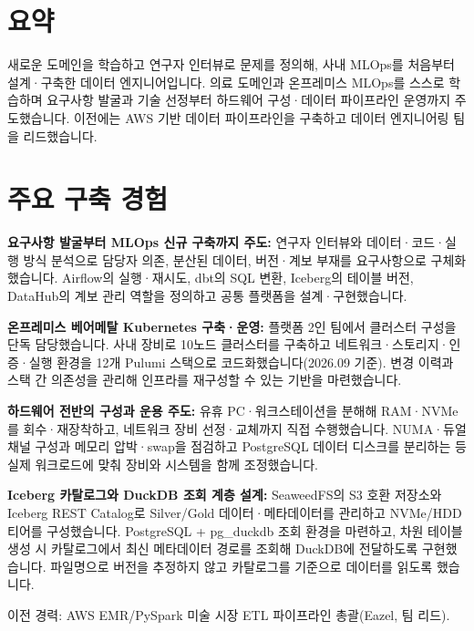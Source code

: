 \section{요약}
\begin{itemize}[leftmargin=0.15in, label={}]
\small{\item{새로운 도메인을 학습하고 연구자 인터뷰로 문제를 정의해, 사내 MLOps를 처음부터 설계·구축한 데이터 엔지니어입니다. 의료 도메인과 온프레미스 MLOps를 스스로 학습하며 요구사항 발굴과 기술 선정부터 하드웨어 구성·데이터 파이프라인 운영까지 주도했습니다. 이전에는 AWS 기반 데이터 파이프라인을 구축하고 데이터 엔지니어링 팀을 리드했습니다.}}
\end{itemize}
\section{주요 구축 경험}
\begin{itemize}[leftmargin=0.15in, label={}]
\small{
\item{\textbf{요구사항 발굴부터 MLOps 신규 구축까지 주도:} 연구자 인터뷰와 데이터·코드·실행 방식 분석으로 담당자 의존, 분산된 데이터, 버전·계보 부재를 요구사항으로 구체화했습니다. Airflow의 실행·재시도, dbt의 SQL 변환, Iceberg의 테이블 버전, DataHub의 계보 관리 역할을 정의하고 공통 플랫폼을 설계·구현했습니다.}
\item{\textbf{온프레미스 베어메탈 Kubernetes 구축·운영:} 플랫폼 2인 팀에서 클러스터 구성을 단독 담당했습니다. 사내 장비로 10노드 클러스터를 구축하고 네트워크·스토리지·인증·실행 환경을 12개 Pulumi 스택으로 코드화했습니다(2026.09 기준). 변경 이력과 스택 간 의존성을 관리해 인프라를 재구성할 수 있는 기반을 마련했습니다.}
\item{\textbf{하드웨어 전반의 구성과 운용 주도:} 유휴 PC·워크스테이션을 분해해 RAM·NVMe를 회수·재장착하고, 네트워크 장비 선정·교체까지 직접 수행했습니다. NUMA·듀얼채널 구성과 메모리 압박·swap을 점검하고 PostgreSQL 데이터 디스크를 분리하는 등 실제 워크로드에 맞춰 장비와 시스템을 함께 조정했습니다.}
\item{\textbf{Iceberg 카탈로그와 DuckDB 조회 계층 설계:} SeaweedFS의 S3 호환 저장소와 Iceberg REST Catalog로 Silver/Gold 데이터·메타데이터를 관리하고 NVMe/HDD 티어를 구성했습니다. PostgreSQL + pg\_duckdb 조회 환경을 마련하고, 차원 테이블 생성 시 카탈로그에서 최신 메타데이터 경로를 조회해 DuckDB에 전달하도록 구현했습니다. 파일명으로 버전을 추정하지 않고 카탈로그를 기준으로 데이터를 읽도록 했습니다.}
\item{이전 경력: AWS EMR/PySpark 미술 시장 ETL 파이프라인 총괄(Eazel, 팀 리드).}
}
\end{itemize}
